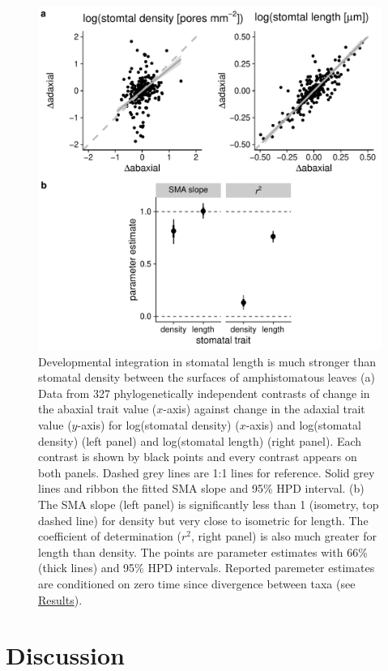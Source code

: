 \documentclass[
  10pt,
]{article}
\begin{document}
\begin{figure}[ht]
\includegraphics[width=\textwidth]{../figures/h2.pdf}
\caption{Developmental integration in stomatal length is much stronger than stomatal density between the surfaces of amphistomatous leaves (a) Data from 327 phylogenetically independent contrasts of change in the abaxial trait value ($x$-axis) against change in the adaxial trait value ($y$-axis) for log(stomatal density) ($x$-axis) and log(stomatal density) (left panel) and log(stomatal length) (right panel). Each contrast is shown by black points and every contrast appears on both panels. Dashed grey lines are 1:1 lines for reference. Solid grey lines and ribbon the fitted SMA slope and 95\% HPD interval. (b) The SMA slope (left panel) is significantly less than 1 (isometry, top dashed line) for density but very close to isometric for length. The coefficient of determination ($r^2$, right panel) is also much greater for length than density. The points are parameter estimates with 66\% (thick lines) and 95\% HPD intervals. Reported paremeter estimates are conditioned on zero time since divergence between taxa (see \protect\hyperlink{results}{Results}).}
\label{fig:h2}
\end{figure}

\hypertarget{discussion}{%
\section{Discussion}\label{discussion}}
\end{document}
